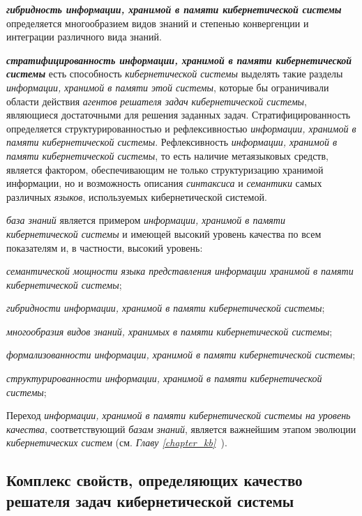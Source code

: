 \textbf{\textit{гибридность информации, хранимой в памяти кибернетической системы}} определяется многообразием видов знаний и степенью конвергенции и интеграции различного вида знаний.

\textbf{\textit{стратифицированность информации, хранимой в памяти кибернетической системы}} есть способность \textit{кибернетической системы} выделять такие разделы \textit{информации, хранимой в памяти этой системы}, которые бы ограничивали области действия \textit{агентов} \textit{решателя задач} \textit{кибернетической системы}, являющиеся достаточными для решения заданных задач.
Стратифицированность определяется структурированностью и рефлексивностью \textit{информации, хранимой в памяти кибернетической системы}.
Рефлексивность \textit{информации, хранимой в памяти кибернетической системы}, то есть наличие метаязыковых средств, является фактором, обеспечивающим не только структуризацию хранимой информации, но и возможность описания \textit{синтаксиса} и \textit{семантики} самых различных \textit{языков}, используемых кибернетической системой.

\textit{база знаний} является примером \textit{информации, хранимой в памяти кибернетической системы} и имеющей высокий уровень качества по всем показателям и, в частности, высокий уровень:
\begin{textitemize}
    \item \textit{семантической мощности языка представления информации хранимой в памяти кибернетической
системы};
    \item \textit{гибридности информации, хранимой в памяти кибернетической системы};
    \item \textit{многообразия видов знаний, хранимых в памяти кибернетической системы};
    \item \textit{формализованности информации, хранимой в памяти кибернетической системы};
    \item \textit{структурированности информации, хранимой в памяти кибернетической системы};
\end{textitemize}

Переход \textit{информации, хранимой в памяти кибернетической системы на уровень качества}, соответствующий \textit{базам знаний}, является важнейшим этапом эволюции \textit{кибернетических систем} (см. \textit{Главу \ref{chapter_kb}~}).

\subsection{Комплекс свойств, определяющих качество решателя задач кибернетической системы}
{\label{sec_cyb_syst_problem_solver_quality}} 

